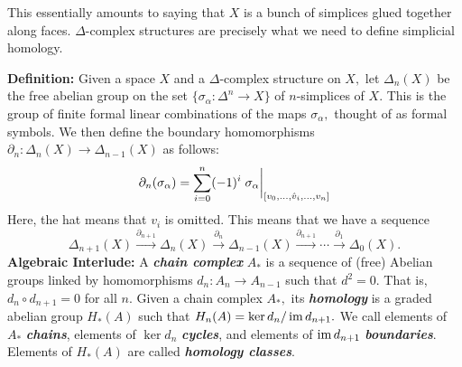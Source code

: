 \documentclass{article}
\begin{document}
\noindent{}This essentially amounts to saying that $X$ is a bunch of simplices glued together along faces. $\Delta$-complex structures are precisely what we need to define simplicial homology.%

\textbf{Definition:} Given a space $X$ and a $\Delta$-complex structure on $X,$ let $\Delta_n(X)$ be the free abelian group on the set $\{\sigma_\alpha: \Delta^n \to X\}$ of $n$-simplices of $X.$ This is the group of finite formal linear combinations of the maps $\sigma_\alpha,$ thought of as formal symbols. We then define the boundary homomorphisms $\partial_n: \Delta_n(X) \to \Delta_{n-1}(X)$ as follows:%
\noindent\noindent\[%
\partial_n(\sigma_\alpha) = \sum_{i=0}^n (-1)^i
  \eval{\sigma_\alpha}_{[v_0, \dots, \hat{v}_i, \dots, v_n]}
\]%
\noindent{}Here, the hat means that $v_i$ is omitted. This means that we have a sequence
\noindent\noindent\[%
\Delta_{n+1}(X) \overset{\partial_{n+1}}{\longrightarrow}
\Delta_{n}(X) \overset{\partial_{n}}{\longrightarrow}
\Delta_{n-1}(X) \overset{\partial_{n+1}}{\longrightarrow}
\cdots \overset{\partial_{1}}{\longrightarrow} \Delta_0(X).
\]%
\noindent{}\textbf{Algebraic Interlude:} A \textbf{\emph{chain complex}} $A_*$ is a sequence of (free) Abelian groups linked by homomorphisms $d_n: A_n \to A_{n-1}$ such that $d^2 = 0.$ That is, $d_n \circ d_{n+1} = 0$ for all $n.$ Given a chain complex $A_*,$ its \textbf{\emph{homology}} is a graded abelian group $H_*(A)$ such that $H_n(A) = \ker d_n / \operatorname{im} d_{n+1}.$ We call elements of $A_*$ \textbf{\emph{chains}}, elements of $\ker d_n$ \textbf{\emph{cycles}}, and elements of $\operatorname{im} d_{n+1}$ \textbf{\emph{boundaries}}. Elements of $H_*(A)$ are called \textbf{\emph{homology classes}}.
\end{document}
